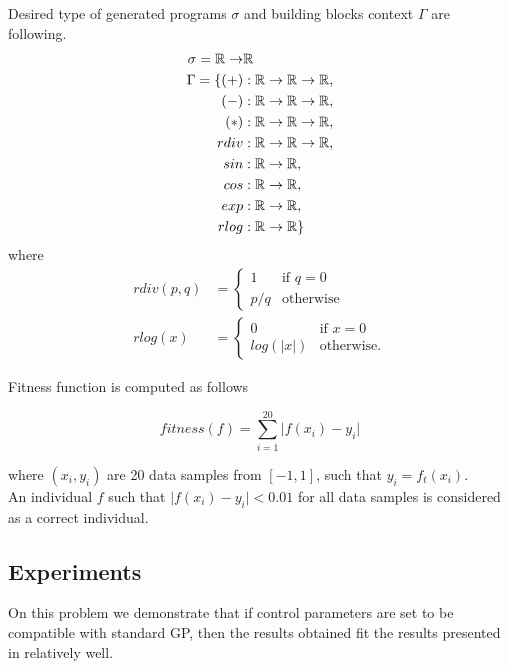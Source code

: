 \documentclass[12pt,a4paper]{report}
\begin{document}
Desired type of generated programs $\sigma$ and 
building blocks context $\Gamma$ are following.
\newcommand{\Real}{\mathbb{R}}
\begin{align*}
\sigma = \Real \ar &\Real\\
\Gamma = \{
  (+)  &: \Real \ar \Real \ar \Real    ,\\
  (-)  &: \Real \ar \Real \ar \Real    ,\\
  (*)  &: \Real \ar \Real \ar \Real    ,\\
  rdiv &: \Real \ar \Real \ar \Real    ,\\
  sin  &: \Real \ar \Real              ,\\
  cos  &: \Real \ar \Real              ,\\
  exp  &: \Real \ar \Real              ,\\ 
  rlog &: \Real \ar \Real              \}\\
\end{align*}
where
\begin{align*}
rdiv(p,q) &= \begin{cases} 1 &\mbox{if } q = 0 \\
p/q & \mbox{otherwise } \end{cases}  \\
rlog(x) &= \begin{cases} 0 &\mbox{if } x = 0 \\
log(\vert x\vert) & \mbox{otherwise}. \end{cases}
\end{align*}

Fitness function is computed as follows

$$ fitness(f) =  \sum\limits_{i=1}^{20}{ \vert f(x_i)-y_i }\vert   $$

where $(x_i,y_i)$ are 20 data samples from $[-1,1]$, such that $y_i = f_t(x_i)$.\\

An individual $f$ such that $\vert f(x_i)-y_i \vert < 0.01 $ for all data samples is 
considered as a correct individual.\\

\newpage
\subsection{Experiments}

On this problem we demonstrate that if control parameters are set to be
compatible with standard GP, then the results obtained fit the results
presented in \cite{koza92} relatively well. \\
\end{document}
